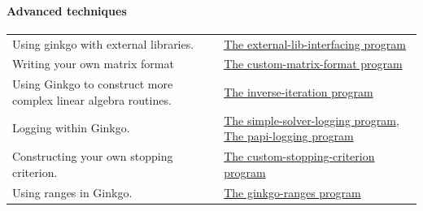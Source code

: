 \paragraph*{{\bfseries Advanced techniques}}

\tabulinesep=1mm
\begin{longtabu} spread 0pt [c]{*{2}{|X[-1]}|}
\hline
Using ginkgo with external libraries.  &\hyperlink{external_lib_interfacing}{The external-\/lib-\/interfacing program}  

\\
Writing your own matrix format  &\hyperlink{custom_matrix_format}{The custom-\/matrix-\/format program}  

\\
Using Ginkgo to construct more complex linear algebra routines.  &\hyperlink{inverse_iteration}{The inverse-\/iteration program}  

\\
Logging within Ginkgo.  &\hyperlink{simple_solver_logging}{The simple-\/solver-\/logging program}, \hyperlink{papi_logging}{The papi-\/logging program}  

\\
Constructing your own stopping criterion.  &\hyperlink{custom_stopping_criterion}{The custom-\/stopping-\/criterion program}  

\\
Using ranges in Ginkgo.  &\hyperlink{ginkgo_ranges}{The ginkgo-\/ranges program}   \\
\end{longtabu}
